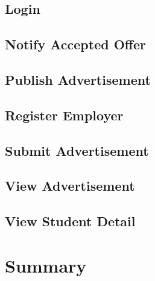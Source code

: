 \documentclass[11pt]{l3deliverable}
\begin{document}


\subsection{Login}



\newpage

\subsection{Notify Accepted Offer}



\newpage

\subsection{Publish Advertisement}



\newpage

\subsection{Register Employer}



\newpage

\subsection{Submit Advertisement}



\newpage

\subsection{View Advertisement}



\newpage

\subsection{View Student Detail}



\newpage

\section{Summary}
\end{document}
